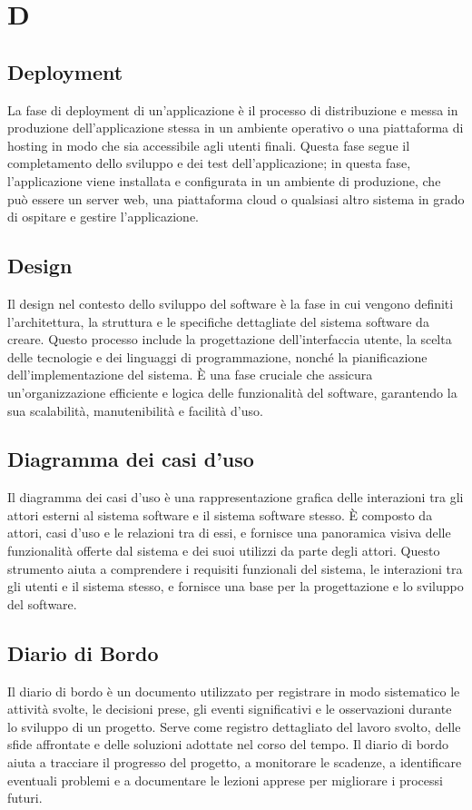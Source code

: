 \section{D} 
\subsection{Deployment} 
La fase di deployment di un'applicazione è il processo di distribuzione e messa in produzione dell'applicazione stessa in un ambiente operativo o una piattaforma di hosting in modo che sia accessibile agli utenti finali. Questa fase segue il completamento dello sviluppo e dei test dell'applicazione; in questa fase, l'applicazione viene installata e configurata in un ambiente di produzione, che può essere un server web, una piattaforma cloud o qualsiasi altro sistema in grado di ospitare e gestire l'applicazione.
\subsection{Design} 
Il design nel contesto dello sviluppo del software è la fase in cui vengono definiti l'architettura, la struttura e le specifiche dettagliate del sistema software da creare. Questo processo include la progettazione dell'interfaccia utente, la scelta delle tecnologie e dei linguaggi di programmazione, nonché la pianificazione dell'implementazione del sistema. È una fase cruciale che assicura un'organizzazione efficiente e logica delle funzionalità del software, garantendo la sua scalabilità, manutenibilità e facilità d'uso.
\subsection{Diagramma dei casi d'uso} 
Il diagramma dei casi d'uso è una rappresentazione grafica delle interazioni tra gli attori esterni al sistema software e il sistema software stesso. È composto da attori, casi d'uso e le relazioni tra di essi, e fornisce una panoramica visiva delle funzionalità offerte dal sistema e dei suoi utilizzi da parte degli attori. Questo strumento aiuta a comprendere i requisiti funzionali del sistema, le interazioni tra gli utenti e il sistema stesso, e fornisce una base per la progettazione e lo sviluppo del software.
\subsection{Diario di Bordo} 
Il diario di bordo è un documento utilizzato per registrare in modo sistematico le attività svolte, le decisioni prese, gli eventi significativi e le osservazioni durante lo sviluppo di un progetto. Serve come registro dettagliato del lavoro svolto, delle sfide affrontate e delle soluzioni adottate nel corso del tempo. Il diario di bordo aiuta a tracciare il progresso del progetto, a monitorare le scadenze, a identificare eventuali problemi e a documentare le lezioni apprese per migliorare i processi futuri.
